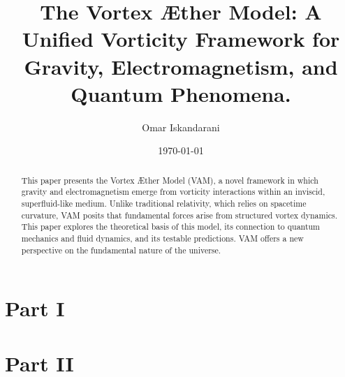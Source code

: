 \documentclass[a4paper,10pt]{article}
\title{The Vortex \AE ther Model: A Unified Vorticity Framework for Gravity, Electromagnetism, and Quantum Phenomena.}
\author{Omar Iskandarani}
\date{\today}
\begin{document}
    \maketitle

    \maketitle

    \begin{abstract}
        This paper presents the Vortex Æther Model (VAM), a novel framework in which gravity and electromagnetism emerge from vorticity interactions within an inviscid, superfluid-like medium. Unlike traditional relativity, which relies on spacetime curvature, VAM posits that fundamental forces arise from structured vortex dynamics. This paper explores the theoretical basis of this model, its connection to quantum mechanics and fluid dynamics, and its testable predictions. VAM offers a new perspective on the fundamental nature of the universe.
    \end{abstract}

    

    \section{Part I}\label{sec:part-1}
    
    
    
    
    
    
    

    \section{Part II}\label{sec:part-2}
    
    
    



    
    
    
    


%    
%    

    
    
\end{document}
